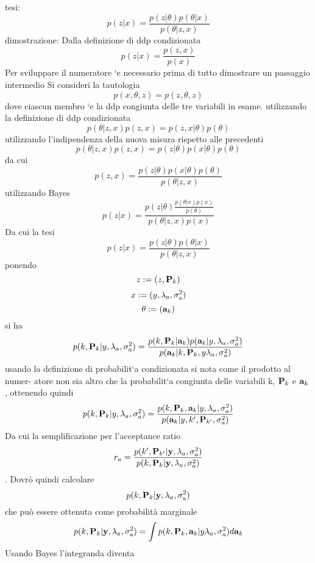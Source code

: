 tesi:
\begin{equation}
p(z|x)=\frac{p(z|\theta)p(\theta|x)}{p(\theta|z,x)}
\end{equation}
dimostrazione: Dalla definizione di ddp condizionata
\begin{equation}
p(z|x)=\frac{p(z,x)}{p(x)}
\end{equation}
Per sviluppare il numeratore `e necessario prima di tutto dimostrare un passaggio
intermedio Si consideri la tautologia
\begin{equation}
p(x,\theta,z)=p(z,\theta,z)
\end{equation}
dove ciascun membro `e la ddp congiunta delle tre variabili in esame. utilizzando la
definizione di ddp condizionata
\begin{equation}
p(\theta|z, x)p(z, x) = p(z, x|\theta)p(\theta)
\end{equation}
utilizzando l’indipendenza della nuova misura rispetto alle precedenti
\begin{equation}
p(\theta|z, x)p(z, x) = p(z|\theta)p(x|\theta)p(\theta)
\end{equation}
da cui
\begin{equation}
p(z,x)=\frac{p(z|\theta)p(x|\theta)p(\theta)
}{p(\theta|z,x)}
\end{equation}
utilizzando Bayes
\begin{equation}
p(z|x)=\frac{p(z|\theta)\frac{p(\theta|x)p(x)}{p(\theta)}}{p(\theta|z,x)p(x)}
\end{equation}
Da cui la tesi
\begin{equation}
p(z|x)=\frac{p(z|\theta)p(\theta|x)}{p(\theta|z,x)}
\end{equation}
ponendo
\begin{equation}
z:=(z,\textbf{P}_k)
\end{equation}
\begin{equation}
x:=(y,\lambda_a,\sigma_a^2)
\end{equation}
\begin{equation}
\theta:=(\textbf{a}_k)
\end{equation}
si ha
\begin{equation}
p(k,\textbf{P}_k|y,\lambda_a,\sigma_a^2)=\frac{p(k,\textbf{P}_k|\textbf{a}_k)p(\textbf{a}_k|y,\lambda_a,\sigma_a^2)}{p(\textbf{a}_k|k,\textbf{P}_k,y\lambda_a,\sigma_a^2)}
\end{equation}
usando la definizione di probabilit`a condizionata si nota come il prodotto al numer-
atore non sia altro che la probabilit`a congiunta delle variabili k, $\textbf{P}_k$ e $\textbf{a}_k$ , ottenendo
quindi
\begin{equation}
p(k,\textbf{P}_k|y,\lambda_a,\sigma_a^2)=\frac{p(k,\textbf{P}_k,\textbf{a}_k|y,\lambda_a,\sigma_a^2)}{p(\textbf{a}_k|y,k',\textbf{P}_{k'},\sigma_a^2)}
\end{equation}
Da cui la semplificazione per l'acceptance ratio
\begin{equation}
r_a=\frac{p(k',\textbf{P}_{k'}|\textbf{y},\lambda_a,\sigma_a^2)}{p(k,\textbf{P}_k|\textbf{y},\lambda_a,\sigma_a^2)}
\end{equation}.
Dovrò quindi calcolare
\begin{equation}
p(k,\textbf{P}_k|\textbf{y},\lambda_a,\sigma_a^2)
\end{equation}
che può essere ottenuta come probabilità marginale
\begin{equation}
p(k,\textbf{P}_k|\textbf{y},\lambda_a,\sigma_a^2)=\int p(k,\textbf{P}_k,\textbf{a}_k|y\lambda_a,\sigma_a^2)d\textbf{a}_k
\end{equation}
Usando Bayes l'integranda diventa